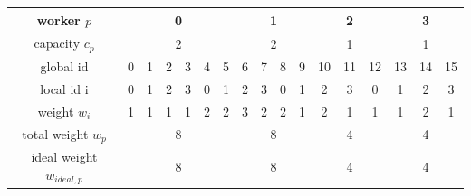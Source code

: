 \begin{table}[H]
    \begin{center}
        \begin{tabular}{ | c | c | c | c | c | c | c | c | c | c | c | c | c | c | c | c | c | } 
            \hline
            worker \(p\) & \multicolumn{6}{c|}{\cellcolor{vs_lightgreen}0} & \multicolumn{4}{c|}{\cellcolor{vs_lightblue}1} & \multicolumn{3}{c|}{\cellcolor{vs_lightred}2} & \multicolumn{3}{c|}{\cellcolor{vs_lightplum}3}  \\
            \hline
            capacity \(c_p\) & \multicolumn{6}{c|}{\cellcolor{vs_lightgreen}2} & \multicolumn{4}{c|}{\cellcolor{vs_lightblue}2} & \multicolumn{3}{c|}{\cellcolor{vs_lightred}1} & \multicolumn{3}{c|}{\cellcolor{vs_lightplum}1}  \\
            \hline
            global id & \cellcolor{vs_lightgreen}0 & \cellcolor{vs_lightgreen}1 & \cellcolor{vs_lightgreen}2 & \cellcolor{vs_lightgreen}3 & \cellcolor{vs_lightgreen}4 & \cellcolor{vs_lightgreen}5 & \cellcolor{vs_lightblue}6 & \cellcolor{vs_lightblue}7 & \cellcolor{vs_lightblue}8 & \cellcolor{vs_lightblue}9 & \cellcolor{vs_lightred}10 & \cellcolor{vs_lightred}11 & \cellcolor{vs_lightred}12 & \cellcolor{vs_lightplum}13 & \cellcolor{vs_lightplum}14 & \cellcolor{vs_lightplum}15 \\ 
            \hline
            local id i & \cellcolor{vs_lightgreen}0 & \cellcolor{vs_lightgreen}1 & \cellcolor{vs_lightgreen}2 & \cellcolor{vs_lightgreen}3 & \cellcolor{vs_lightgreen}0 & \cellcolor{vs_lightgreen}1 & \cellcolor{vs_lightblue}2 & \cellcolor{vs_lightblue}3 & \cellcolor{vs_lightblue}0 & \cellcolor{vs_lightblue}1 & \cellcolor{vs_lightred}2 & \cellcolor{vs_lightred}3 & \cellcolor{vs_lightred}0 & \cellcolor{vs_lightplum}1 & \cellcolor{vs_lightplum}2 & \cellcolor{vs_lightplum}3 \\ 
            \hline
            weight \(w_i\) & \cellcolor{vs_lightgreen}1 & \cellcolor{vs_lightgreen}1 & \cellcolor{vs_lightgreen}1 & \cellcolor{vs_lightgreen}1 & \cellcolor{vs_lightgreen}2 & \cellcolor{vs_lightgreen}2 & \cellcolor{vs_lightblue}3 & \cellcolor{vs_lightblue}2 & \cellcolor{vs_lightblue}2 & \cellcolor{vs_lightblue}1 & \cellcolor{vs_lightred}2 & \cellcolor{vs_lightred}1 & \cellcolor{vs_lightred}1 & \cellcolor{vs_lightplum}1 & \cellcolor{vs_lightplum}2 & \cellcolor{vs_lightplum}1 \\ 
            \hline
            total weight \(w_p\) & \multicolumn{6}{c|}{\cellcolor{vs_lightgreen}8} & \multicolumn{4}{c|}{\cellcolor{vs_lightblue}8} & \multicolumn{3}{c|}{\cellcolor{vs_lightred}4} & \multicolumn{3}{c|}{\cellcolor{vs_lightplum}4} \\ 
            \hline
            ideal weight \(w_{ideal,p}\) & \multicolumn{6}{c|}{\cellcolor{vs_lightgreen}8} & \multicolumn{4}{c|}{\cellcolor{vs_lightblue}8} & \multicolumn{3}{c|}{\cellcolor{vs_lightred}4} & \multicolumn{3}{c|}{\cellcolor{vs_lightplum}4} \\ 
            \hline
        \end{tabular}
    

\end{center}
\end{table}
